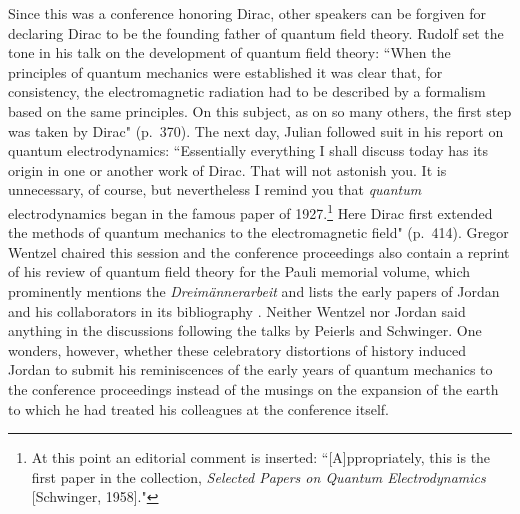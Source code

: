 \documentclass{elsart}
\begin{document}
Since this was a conference honoring Dirac, other speakers can be forgiven for declaring Dirac to be the founding father of quantum field theory. Rudolf \citet{Peierls 1973} set the tone in his talk on the development of quantum field theory: ``When the principles of quantum mechanics were established it was clear that, for consistency, the electromagnetic radiation had to be described by a formalism based on the same principles. On  this subject, as on so many others, the first step was taken by Dirac" (p.\ 370).
The next day, Julian \citet{Schwinger 1973} followed suit in his report on quantum electrodynamics: ``Essentially everything I shall discuss today has its origin in one or another work of Dirac. That will not astonish you. It is unnecessary, of course, but nevertheless I remind you that {\it quantum} electrodynamics began in the famous paper of 1927.\footnote{At this point an editorial comment is inserted: 
``[A]ppropriately, this is the first paper in the collection, {\it Selected Papers on Quantum Electrodynamics} [Schwinger, 1958]."} Here Dirac first extended the methods of quantum mechanics to the electromagnetic field" (p.\ 414). Gregor Wentzel chaired this session and the conference proceedings also contain a reprint of  his review of quantum field theory for the Pauli memorial volume, which prominently mentions the {\it Dreim\"annerarbeit} and lists the early papers of Jordan and his collaborators in its bibliography \citep[p.\ 49 and pp.\ 74--75]{Wentzel 1960}. Neither Wentzel nor Jordan said anything in the discussions following the talks by Peierls and Schwinger.
One wonders, however, whether these celebratory distortions of history induced Jordan to submit his reminiscences of the early years of quantum mechanics to the conference proceedings instead of the musings on the expansion of the earth to which he had treated his colleagues at the conference itself.
\end{document}
